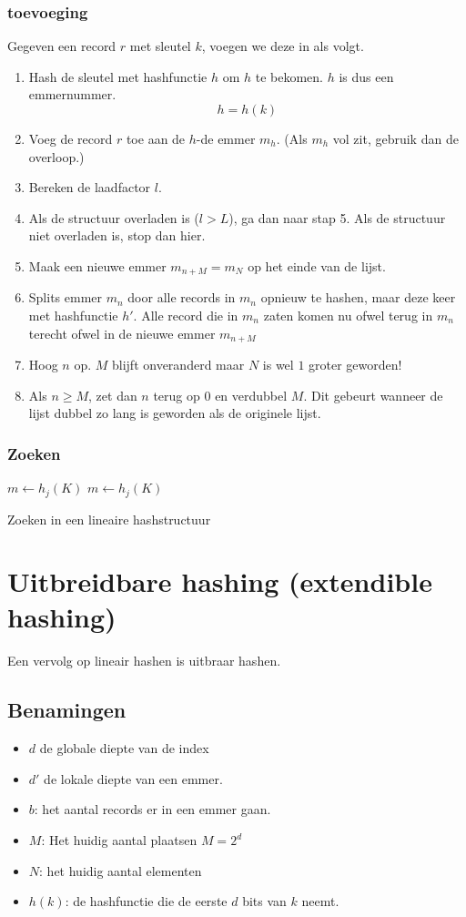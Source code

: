 \documentclass[hashing.tex]{subfiles}
\begin{document}
\subsubsection{toevoeging}
Gegeven een record $r$ met sleutel $k$, voegen we deze in als volgt.
\begin{enumerate}
\item Hash de sleutel met hashfunctie $h$ om $h$ te bekomen. $h$ is dus een emmernummer.
\[
h = h(k)
\]
\item Voeg de record $r$ toe aan de $h$-de emmer $m_h$. (Als $m_h$ vol zit, gebruik dan de overloop.)
\item Bereken de laadfactor $l$. 
\item Als de structuur overladen is ($l> L$), ga dan naar stap 5. Als de structuur niet overladen is, stop dan hier.
\item Maak een nieuwe emmer $m_{n+M}= m_{N}$ op het einde van de lijst.
\item Splits emmer $m_n$ door alle records in $m_n$ opnieuw te hashen, maar deze keer met hashfunctie $h'$. Alle record die in $m_n$ zaten komen nu ofwel terug in $m_n$ terecht ofwel in de nieuwe emmer $m_{n+M}$
\item Hoog $n$ op. $M$ blijft onveranderd maar $N$ is wel $1$ groter geworden!
\item Als $n \ge M$, zet dan $n$ terug op $0$ en verdubbel $M$. Dit gebeurt wanneer de lijst dubbel zo lang is geworden als de originele lijst.

\end{enumerate}


\subsubsection{Zoeken}
\begin{algorithm}
{$m \leftarrow h_{j}(K)$}
{$m \leftarrow h_{j}(K)$\\
}
\caption{Zoeken in een lineaire hashstructuur}
\end{algorithm}


\section{Uitbreidbare hashing (extendible hashing)}
Een vervolg op lineair hashen is uitbraar hashen.
\subsection{Benamingen}
\begin{itemize}
\item $d$ de globale diepte van de index
\item $d'$ de lokale diepte van een emmer.
\item $b$: het aantal records er in een emmer gaan.
\item $M$: Het huidig aantal plaatsen $M = 2^{d}$
\item $N$: het huidig aantal elementen
\item $h(k)$: de hashfunctie die de eerste $d$ bits van $k$ neemt.
\end{itemize}
\end{document}
